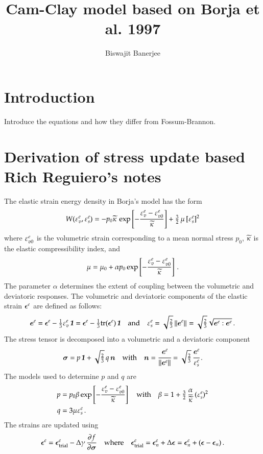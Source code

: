\documentclass[twoside,10pt,a4paper]{article}
\begin{document}

\title{Cam-Clay model based on Borja et al. 1997}
\author{Biswajit Banerjee}
\maketitle
\tableofcontents
\newpage

\section{Introduction}
Introduce the equations and how they differ from Fossum-Brannon.

\section{Derivation of stress update based Rich Reguiero's notes}
The elastic strain energy density in Borja's model has the form
\[
  W(\Ve^e_v,\Ve^e_s) = -p_0\kappatilde\,\exp\left[-\frac{\Ve^e_v - \Ve^e_{v0}}{\kappatilde}\right] 
    + \tfrac{3}{2}\,\mu\,[\Ve^e_s]^2
\]
where $\Ve^e_{v0}$ is the volumetric strain corresponding to a mean normal stress $p_0$, 
$\kappatilde$ is the elastic compressibility index, and
\[
  \mu = \mu_0 + \alpha p_0 \exp\left[-\frac{\Ve^e_v - \Ve^e_{v0}}{\kappatilde}\right]  \,.
\]
The parameter $\alpha$ determines the extent of coupling between the volumetric and deviatoric 
responses.  The volumetric and deviatoric components of the elastic strain $\Beps^e$ are defined
as follows:
\[
   \BeT^e = \Beps^e - \tfrac{1}{3}\Ve^e_v\,\Bone = \Beps^e - \tfrac{1}{3}\Tr(\Beps^e)\,\Bone
   \quad \Tand \quad
   \Ve^e_s = \sqrt{\tfrac{2}{3}}\Norm{\BeT^e}{}  = \sqrt{\tfrac{2}{3}}\sqrt{\BeT^e:\BeT^e} \,.
\]
The stress tensor is decomposed into a volumetric and a deviatoric component
\[
   \Bsig = p\,\Bone + \sqrt{\tfrac{2}{3}}\, q\, \BnT \quad \text{with} \quad
   \BnT = \cfrac{\BeT^e}{\Norm{\BeT^e}{}} = \sqrt{\tfrac{2}{3}}\, \cfrac{\BeT^e}{\Ve^e_s} \,.
\]
The models used to determine $p$ and $q$ are
\[
  \Bal
    p &= p_0\beta\exp\left[-\frac{\Ve^e_v - \Ve^e_{v0}}{\kappatilde}\right] \quad \text{with} \quad
     \beta = 1 + \tfrac{3}{2}\,\frac{\alpha}{\kappatilde}\,(\Ve^e_s)^2 \\
    q &= 3\mu\Ve^e_s \,.
  \Eal
\]
The strains are updated using
\[
  \Beps^e = \Beps^e_{\rm trial} - \Delta\gamma\,\Partial{f}{\Bsig}
  \quad \text{where} \quad \Beps^e_{\rm trial} = \Beps^e_n + \Delta\Beps
     = \Beps^e_n + (\Beps - \Beps_n) \,.
\]
\end{document}
